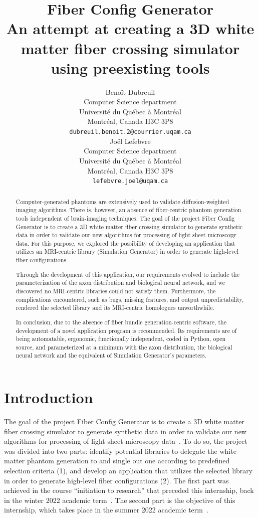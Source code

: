 \documentclass{article}
\title{
  Fiber Config Generator \\
  An attempt at creating a 3D white matter fiber crossing simulator using preexisting tools}
\author{
  Benoît Dubreuil \\
  Computer Science department \\
  Université du Québec à Montréal \\
  Montréal, Canada H3C 3P8 \\
  \texttt{dubreuil.benoit.2@courrier.uqam.ca} \\
  \And
  Joël Lefebvre \\
  Computer Science department\\
  Université du Québec à Montréal \\
  Montréal, Canada H3C 3P8\\
  \texttt{lefebvre.joel@uqam.ca} \\
}
\begin{document}
  \maketitle

  \begin{abstract}
    Computer-generated phantoms are extensively used to validate diffusion-weighted imaging algorithms.
    There is, however, an absence of fiber-centric phantom generation tools independent of brain-imaging techniques.
    The goal of the project Fiber Config Generator is to create a 3D white matter fiber crossing simulator to generate synthetic data in order to validate our new algorithms for processing of light sheet microscopy data.
    For this purpose, we explored the possibility of developing an application that utilizes an MRI-centric library (Simulation Generator) in order to generate high-level fiber configurations.

    Through the development of this application, our requirements evolved to include the parameterization of the axon distribution and biological neural network, and we discovered no MRI-centric libraries could not satisfy them.
    Furthermore, the complications encountered, such as bugs, missing features, and output unpredictability, rendered the selected library and its MRI-centric homologues unworthwhile.

    In conclusion, due to the absence of fiber bundle generation-centric software, the development of a novel application program is recommended.
    Its requirements are of being automatable, ergonomic, functionally independent, coded in Python, open source, and parameterized at a minimum with the axon distribution, the biological neural network and the equivalent of Simulation Generator's parameters.
  \end{abstract}


  \section{Introduction}\label{sec:introduction}

  The goal of the project Fiber Config Generator is to create a 3D white matter fiber crossing simulator to generate synthetic data in order to validate our new algorithms for processing of light sheet microscopy data~\cite{oliveirasicard2021orientation3d}.
  To do so, the project was divided into two parts: identify potential libraries to delegate the white matter phantom
  generation to and single out one according to predefined selection criteria (1), and develop an application that utilizes the selected library in order to generate high-level fiber configurations (2).
  The first part was achieved in the course ``initiation to research'' that preceded this internship, back in the winter 2022 academic term~\cite{dubreuil2022inf6200}.
  The second part is the objective of this internship, which takes place in the summer 2022 academic term~\cite{dubreuil2022inm5803fiberconfiggen, dubreuil2022inm5803simgenfork}.
\end{document}
